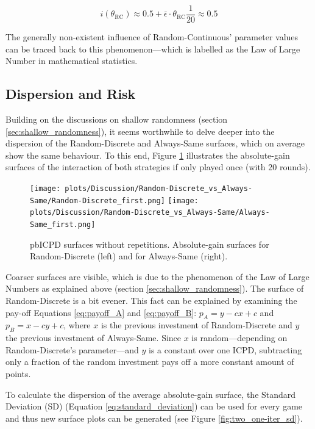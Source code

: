 \documentclass[11pt]{article}
\begin{document}
	\begin{equation}
		i(\theta_{\mathrm{RC}}) \approx 0.5 + \bar \epsilon \cdot \theta_{\mathrm{RC}} \frac{1}{20} \approx 0.5
		\label{eq:i_eq_0.5}
	\end{equation}

	\noindent
	The generally non-existent influence of Random-Continuous' parameter values can be traced back to this phenomenon---which is labelled as the Law of Large Number in mathematical statistics.


\subsection{Dispersion and Risk} \label{sec:dispersion_risk}
	
	Building on the discussions on shallow randomness (section \ref{sec:shallow_randomness}), it seems worthwhile to delve deeper into the dispersion of the Random-Discrete and Always-Same surfaces, which on average show the same behaviour.
	To this end, Figure \ref{fig:two_one-iter} illustrates the absolute-gain surfaces of the interaction of both strategies if only played once (with 20 rounds).

	\begin{figure}[h]
		\centering
		\texttt{[image: plots/Discussion/Random-Discrete\_vs\_Always-Same/Random-Discrete\_first.png]}
		\texttt{[image: plots/Discussion/Random-Discrete\_vs\_Always-Same/Always-Same\_first.png]}\\
		\caption{pbICPD surfaces without repetitions. Absolute-gain surfaces for Random-Discrete (left) and for Always-Same (right).}
		\label{fig:two_one-iter}
	\end{figure}

	\noindent
	Coarser surfaces are visible, which is due to the phenomenon of the Law of Large Numbers as explained above (section \ref{sec:shallow_randomness}).
	The surface of Random-Discrete is a bit evener. 
	This fact can be explained by examining the pay-off Equations \ref{eq:payoff_A} and \ref{eq:payoff_B}:
	$p_A = y - c x + c$ and $p_B = x - c y + c$, where $x$ is the previous investment of Random-Discrete and $y$ the previous investment of Always-Same.
	Since $x$ is random---depending on Random-Discrete's parameter---and $y$ is a constant over one ICPD, subtracting only a fraction of the random investment pays off a more constant amount of points.

	To calculate the dispersion of the average absolute-gain surface, the Standard Deviation (SD) (Equation \ref{eq:standard_deviation}) can be used for every game and thus new surface plots can be generated (see Figure \ref{fig:two_one-iter_sd}). 
\end{document}
